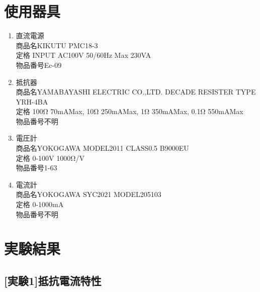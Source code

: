 \documentclass[titlepage]{jarticle}
\begin{document}
\section{使用器具}
\begin{enumerate}
    \item 直流電源\\商品名KIKUTU PMC18-3\\定格 INPUT AC100V 50/60Hz Max 230VA\\物品番号Ec-09
    \item 抵抗器\\商品名YAMABAYASHI ELECTRIC CO.,LTD. DECADE RESISTER TYPE YRH-4BA\\
    定格 100Ω 70mAMax, 10Ω 250mAMax, 1Ω 350mAMax, 0.1Ω 550mAMax\\物品番号不明
    \item 電圧計\\商品名YOKOGAWA MODEL2011 CLASS0.5 B9000EU\\定格 0-100V 1000Ω/V\\
    物品番号1-63
    \item 電流計\\商品名YOKOGAWA SYC2021 MODEL205103\\定格 0-1000mA\\物品番号不明
\end{enumerate}

\section{実験結果}
\subsection{[実験1]抵抗電流特性}
\end{document}
